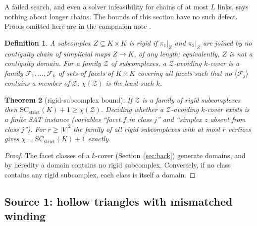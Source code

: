 \documentclass[12pt]{article}
\newcommand{\SC}{\mathrm{SC}}
\newcommand{\SCst}{\SC_{\mathrm{strict}}}
\newcommand{\gen}[1]{\langle #1\rangle}
\newtheorem{theo}{Theorem}[section]
\newtheorem{definition}[theo]{Definition}
\begin{document}
A failed search, and even a solver infeasibility for chains of at most $L$
links, says nothing about longer chains.  The bounds of this section have no
such defect.  Proofs omitted here are in the companion note \cite{PM26b}.

\begin{definition}\label{def:rigid}
A subcomplex $Z\subseteq K\times K$ is \emph{rigid} if $\pi_1|_Z$ and
$\pi_2|_Z$ are joined by no contiguity chain of simplicial maps $Z\to K$, of
any length; equivalently, $Z$ is not a contiguity domain.  For a family
$\mathcal Z$ of subcomplexes, a \emph{$\mathcal Z$-avoiding $k$-cover} is a
family $\mathcal F_1,\dots,\mathcal F_k$ of sets of facets of $K\times K$
covering all facets such that no $\gen{\mathcal F_j}$ contains a member of
$\mathcal Z$; $\chi(\mathcal Z)$ is the least such $k$.
\end{definition}

\begin{theo}[rigid-subcomplex bound]\label{thm:bound}
If $\mathcal Z$ is a family of rigid subcomplexes then $\SCst(K)+1\ge\chi(\mathcal Z)$.
Deciding whether a $\mathcal Z$-avoiding $k$-cover exists is a finite SAT
instance (variables ``facet $f$ in class $j$'' and ``simplex $z$ absent from
class $j$'').  For $r\ge|V|^2$ the family of all rigid subcomplexes with at
most $r$ vertices gives $\chi=\SCst(K)+1$ exactly.
\end{theo}

\begin{proof}
The facet classes of a $k$-cover (Section~\ref{sec:back}) generate domains,
and by heredity a domain contains no rigid subcomplex.  Conversely, if no
class contains any rigid subcomplex, each class is itself a domain.
\end{proof}

\subsection{Source 1: hollow triangles with mismatched winding}
\end{document}
